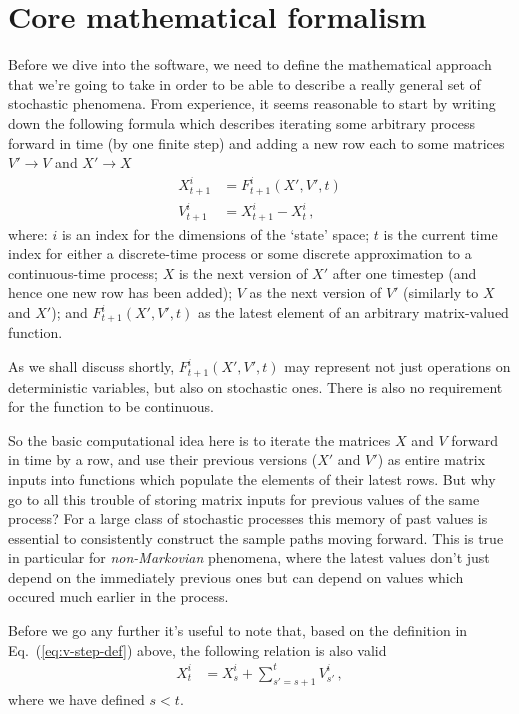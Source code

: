 \documentclass{book}
\begin{document}
\section{\sffamily Core mathematical formalism}

Before we dive into the software, we need to define the mathematical approach that we're going to take in order to be able to describe a really general set of stochastic phenomena. From experience, it seems reasonable to start by writing down the following formula which describes iterating some arbitrary process forward in time (by one finite step) and adding a new row each to some matrices $V' \rightarrow V$ and $X' \rightarrow X$
\begin{align}
X^{i}_{t+1} &= F^{i}_{t+1}(X', V', t) \label{eq:x-step-def}\\
V^{i}_{t+1} &= X^{i}_{t+1} - X^{i}_{t} \label{eq:v-step-def}\,,
\end{align}
where: $i$ is an index for the dimensions of the `state' space; $t$ is the current time index for either a discrete-time process or some discrete approximation to a continuous-time process; $X$ is the next version of $X'$ after one timestep (and hence one new row has been added); $V$ as the next version of $V'$ (similarly to $X$ and $X'$); and $F^i_{t+1}(X', V', t)$ as the latest element of an arbitrary matrix-valued function. 

As we shall discuss shortly, $F^i_{t+1}(X', V', t)$ may represent not just operations on deterministic variables, but also on stochastic ones. There is also no requirement for the function to be continuous.

So the basic computational idea here is to iterate the matrices $X$ and $V$ forward in time by a row, and use their previous versions ($X'$ and $V'$) as entire matrix inputs into functions which populate the elements of their latest rows. But why go to all this trouble of storing matrix inputs for previous values of the same process? For a large class of stochastic processes this memory of past values is essential to consistently construct the sample paths moving forward. This is true in particular for \emph{non-Markovian} phenomena, where the latest values don't just depend on the immediately previous ones but can depend on values which occured much earlier in the process.

Before we go any further it's useful to note that, based on the definition in Eq.~(\ref{eq:v-step-def}) above, the following relation is also valid
\begin{align}
X^{i}_{t} &= X_{s}^{i} + \sum_{s'=s+1}^{t}V_{s'}^{i} \label{eq:x-implicit-solution} \,,
\end{align}
where we have defined $s<t$.
\end{document}
